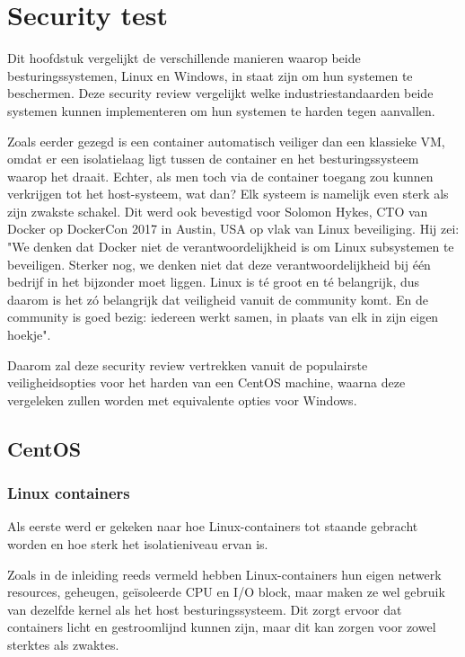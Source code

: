
\chapter{Security test}
\label{ch:securitytest}

Dit hoofdstuk vergelijkt de verschillende manieren waarop beide besturingssystemen, Linux en Windows, in staat zijn om hun systemen te beschermen. Deze security review vergelijkt welke industriestandaarden beide systemen kunnen implementeren om hun systemen te harden tegen aanvallen.

Zoals eerder gezegd is een container automatisch veiliger dan een klassieke VM, omdat er een isolatielaag ligt tussen de container en het besturingssysteem waarop het draait. Echter, als men toch via de container toegang zou kunnen verkrijgen tot het host-systeem, wat dan? Elk systeem is namelijk even sterk als zijn zwakste schakel. Dit werd ook bevestigd voor Solomon Hykes, CTO van Docker op DockerCon 2017 in Austin, USA op vlak van Linux beveiliging. Hij zei: "We denken dat Docker niet de verantwoordelijkheid is om Linux subsystemen te beveiligen. Sterker nog, we denken niet dat deze verantwoordelijkheid bij één bedrijf in het bijzonder moet liggen. Linux is té groot en té belangrijk, dus daarom is het zó belangrijk dat veiligheid vanuit de community komt. En de community is goed bezig: iedereen werkt samen, in plaats van elk in zijn eigen hoekje".

Daarom zal deze security review vertrekken vanuit de populairste veiligheidsopties voor het harden van een CentOS machine, waarna deze vergeleken zullen worden met equivalente opties voor Windows.

\section{CentOS}
\subsection{Linux containers}
Als eerste werd er gekeken naar hoe Linux-containers tot staande gebracht worden en hoe sterk het isolatieniveau ervan is.

Zoals in de inleiding reeds vermeld hebben Linux-containers hun eigen netwerk resources, geheugen, geïsoleerde CPU en I/O block, maar maken ze wel gebruik van dezelfde kernel als het host besturingssysteem. Dit zorgt ervoor dat containers licht en gestroomlijnd kunnen zijn, maar dit kan zorgen voor zowel sterktes als zwaktes.

